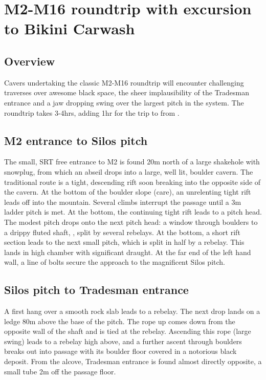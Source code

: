 \section{M2-M16 roundtrip with excursion to Bikini Carwash}
\subsection{Overview}
Cavers undertaking the classic M2-M16 roundtrip will encounter challenging traverses over awesome black space, the sheer implausibility of the Tradesman entrance and a jaw dropping swing over the largest pitch in the system. The roundtrip takes 3-4hrs, adding 1hr for the trip to  from . 

\subsection{M2 entrance to Silos pitch}
The small, SRT free entrance to M2 is found 20m north of a large shakehole with snowplug, from which an abseil drops into a large, well lit, boulder cavern. The traditional route is a tight, descending rift soon breaking into the opposite side of the cavern. At the bottom of the boulder slope (care), an unrelenting tight rift leads off into the mountain. Several climbs interrupt the passage until a 3m ladder pitch is met. At the bottom, the continuing tight rift leads to a pitch head. The modest pitch drops onto the next pitch head: a window through boulders to a drippy fluted shaft, , split by several rebelays. At the bottom, a short rift section leads to the next small pitch, which is split in half by a rebelay. This lands in high chamber with significant draught. At the far end of the left hand wall, a line of bolts secure the approach to the magnificent Silos pitch. 

\subsection{Silos pitch to Tradesman entrance}
A first hang over a smooth rock slab leads to a rebelay. The next drop lands on a ledge 80m above the base of the pitch. The rope up  comes down from the opposite wall of the shaft and is tied at the rebelay. Ascending this rope (large swing) leads to a rebelay high above, and a further ascent through boulders breaks out into  passage with its boulder floor covered in a notorious black deposit. From the  alcove, Tradesman entrance is found almost directly opposite, a small tube 2m off the passage floor. 

